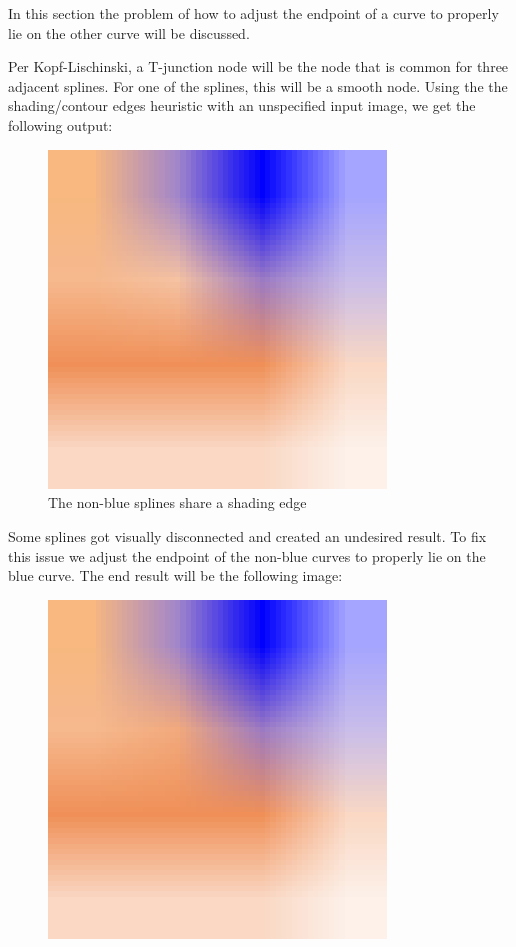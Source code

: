 In this section the problem of how to adjust the endpoint of a curve to properly
lie on the other curve will be discussed.

Per Kopf-Lischinski, a T-junction node will be the node that is common for three
adjacent splines. For one of the splines, this will be a smooth node. Using the
the shading/contour edges heuristic with an unspecified input image, we get the
following output:

\begin{figure}[H]
  \centering
  \includegraphics[width=0.8\textwidth]{assets/shading-heuristic.pdf}
  \caption{The non-blue splines share a shading edge}
\end{figure}

Some splines got visually disconnected and created an undesired result. To fix
this issue we adjust the endpoint of the non-blue curves to properly lie on the
blue curve. The end result will be the following image:

\begin{figure}[H]
  \centering
  \includegraphics[width=0.8\textwidth]{assets/shading-heuristic-fixed.pdf}
\end{figure}


